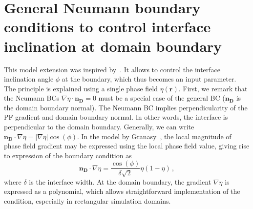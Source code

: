 \section{General Neumann boundary conditions to control interface inclination at domain boundary}
This model extension was inspired by~\cite{Granasy2007}. It allows to control the interface inclination angle $\phi$ at the boundary, which thus becomes an input parameter. The principle is explained using a single phase field $\eta(\bm{r})$. 
First, we remark that the Neumann BCs $\nabla\eta\cdot\bm{n_D}=0$ must be a special case of the general BC ($\bm{n_D}$ is the domain boundary normal). The Neumann BC implies perpendicularity of the PF gradient and domain boundary normal. In other words, the interface is perpendicular to the domain boundary. Generally, we can write $\bm{n_D}\cdot \nabla\eta=|\nabla\eta|\cos(\phi)$. In the model by Granasy~\cite{Granasy2007}, the local magnitude of phase field gradient may be expressed using the local phase field value, giving rise to expression of the boundary condition as
\begin{equation}
	\bm{n_D}\cdot \nabla\eta=\frac{\cos(\phi)}{\delta\sqrt{2}}\eta(1-\eta)\,,
\end{equation}
where $\delta$ is the interface width. At the domain boundary, the gradient $\nabla\eta$ is expressed as a polynomial, which allows straightforward implementation of the condition, especially in rectangular simulation domains.\\

